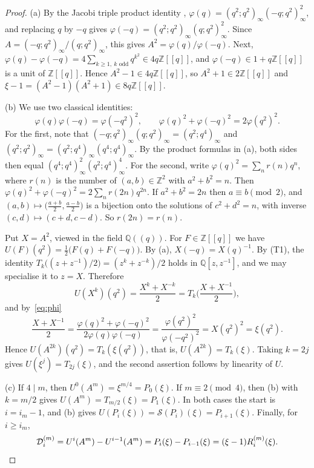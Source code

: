 \documentclass[11pt]{amsart}
\theoremstyle{definition}
\theoremstyle{remark}
\newcommand{\Z}{\mathbb{Z}}
\newcommand{\Q}{\mathbb{Q}}
\newcommand{\Sop}{\mathcal{S}}
\newcommand{\Dc}{\mathcal{D}}
\begin{document}
\begin{proof}
(a) By the Jacobi triple product identity \cite[Theorem~2.8]{And}, $\varphi(q)=(q^2;q^2)_\infty(-q;q^2)_\infty^2$, and replacing $q$ by $-q$ gives $\varphi(-q)=(q^2;q^2)_\infty(q;q^2)_\infty^2$. Since $A=(-q;q^2)_\infty/(q;q^2)_\infty$, this gives $A^2=\varphi(q)/\varphi(-q)$. Next, $\varphi(q)-\varphi(-q)=4\sum_{k\ge1,\ k\text{ odd}}q^{k^2}\in4q\Z[[q]]$, and $\varphi(-q)\in1+q\Z[[q]]$ is a unit of $\Z[[q]]$. Hence $A^2-1\in4q\Z[[q]]$, so $A^2+1\in2\Z[[q]]$ and $\xi-1=(A^2-1)(A^2+1)\in8q\Z[[q]]$.

(b) We use two classical identities:
\begin{equation}\label{eq:phi}
  \varphi(q)\varphi(-q)=\varphi(-q^2)^2,\qquad \varphi(q)^2+\varphi(-q)^2=2\varphi(q^2)^2 .
\end{equation}
For the first, note that $(-q;q^2)_\infty(q;q^2)_\infty=(q^2;q^4)_\infty$ and $(q^2;q^2)_\infty=(q^2;q^4)_\infty(q^4;q^4)_\infty$. By the product formulas in (a), both sides then equal $(q^4;q^4)_\infty^2(q^2;q^4)_\infty^4$. For the second, write $\varphi(q)^2=\sum_n r(n)q^n$, where $r(n)$ is the number of $(a,b)\in\Z^2$ with $a^2+b^2=n$. Then $\varphi(q)^2+\varphi(-q)^2=2\sum_n r(2n)q^{2n}$. If $a^2+b^2=2n$ then $a\equiv b\pmod 2$, and $(a,b)\mapsto\big(\tfrac{a+b}2,\tfrac{a-b}2\big)$ is a bijection onto the solutions of $c^2+d^2=n$, with inverse $(c,d)\mapsto(c+d,c-d)$. So $r(2n)=r(n)$.

Put $X=A^2$, viewed in the field $\Q((q))$. For $F\in\Z[[q]]$ we have $U(F)(q^2)=\tfrac12\big(F(q)+F(-q)\big)$. By (a), $X(-q)=X(q)^{-1}$. By (T1), the identity $T_k\big((z+z^{-1})/2\big)=(z^k+z^{-k})/2$ holds in $\Q[z,z^{-1}]$, and we may specialise it to $z=X$. Therefore
\[
  U(X^k)(q^2)=\frac{X^k+X^{-k}}2=T_k\Big(\frac{X+X^{-1}}2\Big),
\]
and by~\eqref{eq:phi}
\[
  \frac{X+X^{-1}}2=\frac{\varphi(q)^2+\varphi(-q)^2}{2\varphi(q)\varphi(-q)}=\frac{\varphi(q^2)^2}{\varphi(-q^2)^2}=X(q^2)^2=\xi(q^2).
\]
Hence $U(A^{2k})(q^2)=T_k(\xi(q^2))$, that is, $U(A^{2k})=T_k(\xi)$. Taking $k=2j$ gives $U(\xi^j)=T_{2j}(\xi)$, and the second assertion follows by linearity of $U$.

(c) If $4\mid m$, then $U^0(A^m)=\xi^{m/4}=P_0(\xi)$. If $m\equiv2\pmod4$, then (b) with $k=m/2$ gives $U(A^m)=T_{m/2}(\xi)=P_1(\xi)$. In both cases the start is $i=i_m-1$, and (b) gives $U(P_i(\xi))=\Sop(P_i)(\xi)=P_{i+1}(\xi)$. Finally, for $i\ge i_m$,
\[
  \Dc^{(m)}_i=U^i(A^m)-U^{i-1}(A^m)=P_i(\xi)-P_{i-1}(\xi)=(\xi-1)R^{(m)}_i(\xi).\qedhere
\]
\end{proof}
\end{document}
